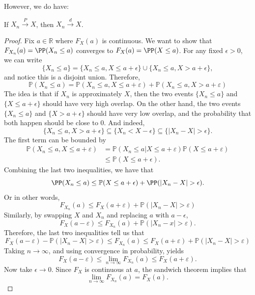\documentclass{ximera}
\begin{document}
However, we do have:
\begin{theorem}
If $X_n \stackrel{P}{\rightarrow} X$, then $X_n \stackrel{d}{\rightarrow} X$. 
\end{theorem}
\begin{proof}
Fix $a \in \mathbb{R}$ where $F_X(a)$ is continuous. We want to show that $F_{X_n}(a) = \PP(X_n \leq a)$ converges to $F_X(a) = \PP(X \leq a)$. For any fixed $\epsilon >0$, we can write
$$
\{X_n \leq a\} = \{X_n \leq a, X \leq a + \epsilon\} \cup \{X_n \leq a, X > a + \epsilon\} ,
$$
and notice this is a disjoint union. Therefore, 
\begin{equation*}
\mathbb{P}\left(X_{n} \leqslant a\right)=\mathbb{P}\left(X_{n} \leqslant a, X \leqslant a+\varepsilon\right)+\mathbb{P}\left(X_{n} \leq a, X>a+\varepsilon\right)
\end{equation*}
The idea is that if $X_n$ is approximately $X$, then the two events $\{X_n \leq a\}$ and $\{X \leq a + \epsilon\}$ should have very high overlap. On the other hand, the two events $\{X_n \leq a\}$ and $\{X > a + \epsilon\}$ should have very low overlap, and the probability that both happen should be close to $0$. And indeed, 
$$
\{X_n \leq a, X > a + \epsilon\} \subseteq \{ X_n < X - \epsilon\} \subseteq \{ \vert X_n - X \vert > \epsilon\}.
$$
The first term can be bounded by 
\begin{align*}
\mathbb{P}\left(X_{n} \leqslant a, X \leqslant a+\varepsilon\right) &= \mathbb{P}\left(X_{n} \leq a | X \leqslant a+\varepsilon\right) \mathbb{P}(X \leqslant a+\varepsilon)\\
&\leq \mathbb{P}(X \leq a + \epsilon).
\end{align*}
Combining the last two inequalities, we have that
$$
\PP(X_n \leq a ) \leq  \mathbb{P}(X \leq a + \epsilon) + \PP(\vert X_n - X \vert > \epsilon).
$$
Or in other words, 
$$
F_{X_n}(a) \leq F_{X}(a+\varepsilon)+\mathbb{P}\left(\left|X_{n}-X\right|>\varepsilon\right)
$$
Similarly, by swapping $X$ and $X_n$ and replacing $a$ with $a-\epsilon$,
$$
F_{X}(a-\varepsilon) \leqslant F_{X_{n}}(a)+\mathbb{P}\left(\left|X_{n}-x\right|>\varepsilon\right).
$$
Therefore, the last two inequalities tell us that
$$
 F_{X}(a-\varepsilon)-\mathbb{P}\left(\left|X_{n}-X\right|>\varepsilon\right) \leqslant F_{X_{n}}(a) \leqslant F_{X}(a+\varepsilon) +\mathbb{P}\left(\left|X_{n}-X\right|>\varepsilon\right) 
$$
Taking $n\rightarrow\infty$, and using convergence in probability, yields
$$
F_{X}(a-\varepsilon) \leq \lim_{n\rightarrow \infty}F_{X_{n}}(a) \leq F_{X}(a+\varepsilon) .
$$
Now take $\epsilon\rightarrow 0$. Since $F_X$ is continuous at $a$, the sandwich theorem implies that
$$
\lim_{n\rightarrow \infty}F_{X_{n}}(a)  = F_X(a).
$$
\end{proof}
\end{document}
